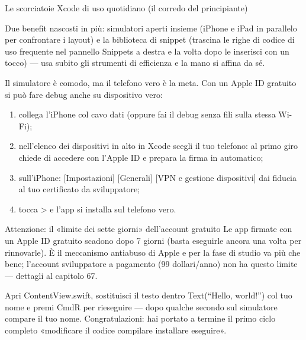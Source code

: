 \begin{center}\small\color{gray}Le scorciatoie Xcode di uso quotidiano (il corredo del principiante)\end{center}

Due benefit nascosti in più: simulatori aperti insieme (iPhone e iPad in parallelo per confrontare i layout) e la biblioteca di snippet (trascina le righe di codice di uso frequente nel pannello Snippets a destra e la volta dopo le inserisci con un tocco) — usa subito gli strumenti di efficienza e la mano si affina da sé.


Il simulatore è comodo, ma il telefono vero è la meta. Con un Apple ID gratuito si può fare debug anche su dispositivo vero:

\begin{enumerate}
  \item collega l'iPhone col cavo dati (oppure fai il debug senza fili sulla stessa Wi-Fi);
  \item nell'elenco dei dispositivi in alto in Xcode scegli il tuo telefono: al primo giro chiede di accedere con l'Apple ID e prepara la firma in automatico;
  \item sull'iPhone: [Impostazioni] [Generali] [VPN e gestione dispositivi] dai fiducia al tuo certificato da sviluppatore;
  \item tocca > e l'app si installa sul telefono vero.
\end{enumerate}

\begin{tcbwarn}{Attenzione: il «limite dei sette giorni» dell'account gratuito}
Le app firmate con un Apple ID gratuito scadono dopo 7 giorni (basta eseguirle ancora una volta per rinnovarle). È il meccanismo antiabuso di Apple e per la fase di studio va più che bene; l'account sviluppatore a pagamento (99 dollari/anno) non ha questo limite — dettagli al capitolo 67.

\end{tcbwarn}



Apri ContentView.swift, sostituisci il testo dentro Text(“Hello, world!”) col tuo nome e premi CmdR per rieseguire — dopo qualche secondo sul simulatore compare il tuo nome. Congratulazioni: hai portato a termine il primo ciclo completo «modificare il codice compilare installare eseguire».

